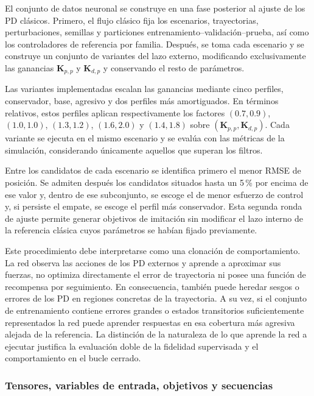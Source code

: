 El conjunto de datos neuronal se construye en una fase posterior al ajuste
de los PD clásicos. Primero, el flujo clásico fija los escenarios, trayectorias,
perturbaciones, semillas y particiones entrenamiento--validación--prueba, así
como los controladores de referencia por familia. Después, se toma cada escenario y
se construye un conjunto de variantes del lazo externo, modificando exclusivamente las ganancias
$\bm{K}_{p,p}$ y $\bm{K}_{d,p}$ y conservando el resto de parámetros.

Las variantes implementadas escalan las ganancias mediante cinco perfiles, conservador,
base, agresivo y dos perfiles más amortiguados. En términos relativos, estos perfiles
aplican respectivamente los factores $(0.7,0.9)$, $(1.0,1.0)$, $(1.3,1.2)$, $(1.6,2.0)$ y $(1.4,1.8)$ sobre
$(\bm{K}_{p,p},\bm{K}_{d,p})$. Cada variante se ejecuta en el mismo escenario y
se evalúa con las métricas de la simulación, considerando únicamente aquellos que
superan los filtros.

Entre los candidatos de cada escenario se identifica primero el menor
RMSE de posición. Se admiten después los candidatos situados hasta un 5\,\% por
encima de ese valor y, dentro de ese subconjunto, se escoge el de menor esfuerzo
de control y, si persiste el empate, se escoge el perfil más conservador. Esta segunda
ronda de ajuste permite generar objetivos de imitación sin modificar el lazo interno
de la referencia clásica cuyos parámetros se habían fijado previamente.

Este procedimiento debe interpretarse como una clonación de comportamiento. La red
observa las acciones de los PD externos y aprende a aproximar sus
fuerzas, no optimiza directamente el error de trayectoria ni posee una función
de recompensa por seguimiento. En consecuencia, también puede heredar sesgos o
errores de los PD en regiones concretas de la trayectoria. A su vez, si el
conjunto de entrenamiento contiene errores grandes o estados transitorios suficientemente
representados la red puede aprender respuestas en esa cobertura más agresiva alejada de la
referencia. La distinción de la naturaleza de lo que aprende la red a ejecutar justifica la
evaluación doble de la fidelidad supervisada y el comportamiento en el bucle cerrado.

\subsubsection*{Tensores, variables de entrada, objetivos y secuencias}
\label{subsubsec:tensores-entradas-objetivos}

